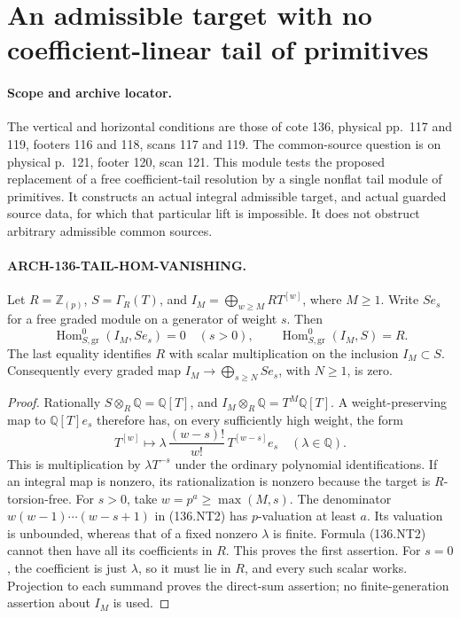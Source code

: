\section{An admissible target with no coefficient-linear tail of primitives}
\label{sec:136-native-tail-nosplit}

\paragraph{Scope and archive locator.}
The vertical and horizontal conditions are those of cote 136,
physical pp.~117 and 119, footers 116 and 118, scans 117 and 119.
The common-source question is on physical p.~121, footer 120,
scan 121. This module tests the proposed replacement of a free
coefficient-tail resolution by a single nonflat tail module of
primitives. It constructs an actual integral admissible target,
and actual guarded source data, for which that particular lift is
impossible. It does not obstruct arbitrary admissible common sources.

\paragraph{ARCH-136-TAIL-HOM-VANISHING.}
Let \(R=\mathbb Z_{(p)}\), \(S=\Gamma_R(T)\), and
\(I_M=\bigoplus_{w\geq M}R T^{[w]}\), where \(M\geq1\).
Write \(S e_s\) for a free graded module on a generator of weight
\(s\). Then
\[
 \operatorname{Hom}^{0}_{S,\mathrm{gr}}(I_M,S e_s)=0
                 \quad(s>0),\qquad
 \operatorname{Hom}^{0}_{S,\mathrm{gr}}(I_M,S)=R.
                                                        \tag{136.NT1}
\]
The last equality identifies \(R\) with scalar multiplication on
the inclusion \(I_M\subset S\). Consequently every graded map
\(I_M\to\bigoplus_{s\geq N}S e_s\), with \(N\geq1\), is zero.

\begin{proof}
Rationally \(S\otimes_R\mathbb Q=\mathbb Q[T]\), and
\(I_M\otimes_R\mathbb Q=T^M\mathbb Q[T]\).
A weight-preserving map to \(\mathbb Q[T]e_s\) therefore has,
on every sufficiently high weight, the form
\[
 T^{[w]}\longmapsto
       \lambda\,\frac{(w-s)!}{w!}\,T^{[w-s]}e_s
             \quad(\lambda\in\mathbb Q).               \tag{136.NT2}
\]
This is multiplication by \(\lambda T^{-s}\) under the ordinary
polynomial identifications. If an integral map is nonzero, its
rationalization is nonzero because the target is \(R\)-torsion-free.
For \(s>0\), take \(w=p^a\geq\max(M,s)\). The denominator
\(w(w-1)\cdots(w-s+1)\) in (136.NT2) has \(p\)-valuation at
least \(a\). Its valuation is unbounded, whereas that of a fixed
nonzero \(\lambda\) is finite. Formula (136.NT2) cannot then have
all its coefficients in \(R\). This proves the first assertion.
For \(s=0\), the coefficient is just \(\lambda\), so it must lie
in \(R\), and every such scalar works.
Projection to each summand proves the direct-sum assertion; no
finite-generation assertion about \(I_M\) is used.
\end{proof}

